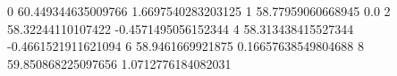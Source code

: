 0 60.449344635009766 1.6697540283203125
1 58.77959060668945 0.0
2 58.32244110107422 -0.4571495056152344
4 58.313438415527344 -0.4661521911621094
6 58.9461669921875 0.16657638549804688
8 59.850868225097656 1.0712776184082031
